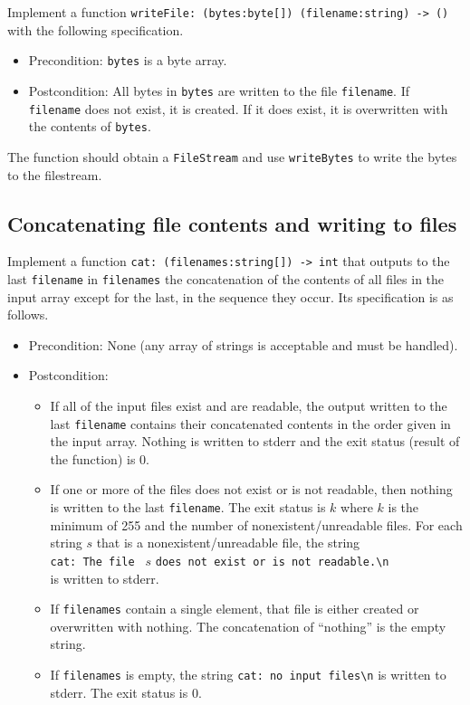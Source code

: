 Implement a function \texttt{writeFile: (bytes:byte[]) (filename:string) -> ()} with the following specification. 
\begin{itemize}
\item Precondition: \texttt{bytes} is a byte array.
\item Postcondition: All bytes in \texttt{bytes} are written to the file \texttt{filename}. If \texttt{filename} does not exist, it is created. If it does exist, it is overwritten with the contents of \texttt{bytes}.
\end{itemize}

The function should obtain a \texttt{FileStream} and use \texttt{writeBytes} to write the bytes to the filestream. 



\subsection*{Concatenating file contents and writing to files}

Implement a function \texttt{cat: (filenames:string[]) -> int} that outputs to the last \texttt{filename} in \texttt{filenames} the concatenation of the contents of all files in the input array except for the last, in the sequence they occur. Its specification is as follows.
\begin{itemize}
\item Precondition: None (any array of strings is acceptable and must be handled).
\item Postcondition: 
\begin{itemize}
\item If all of the input files exist and are readable, the output written to the last \texttt{filename} contains their concatenated contents in the order given in the input array. Nothing is written to stderr and the exit status (result of the function) is $0$.
\item If one or more of the files does not exist or is not readable, then
  nothing is written to the last \texttt{filename}. The exit status is $k$ where $k$ is the minimum of 255 and the number of nonexistent/unreadable files. For each string $s$ that is a nonexistent/unreadable file, the string \\ \verb|cat: The file | $s$ \verb|does not exist or is not readable.\n| \\ is written to stderr.
\item If \texttt{filenames} contain a single element, that file is either created or overwritten with nothing. The concatenation of ``nothing'' is the empty string.
  \item If \texttt{filenames} is empty, the string \verb|cat: no input files\n| is written to stderr. The exit status is 0. 
\end{itemize}
\end{itemize} 

